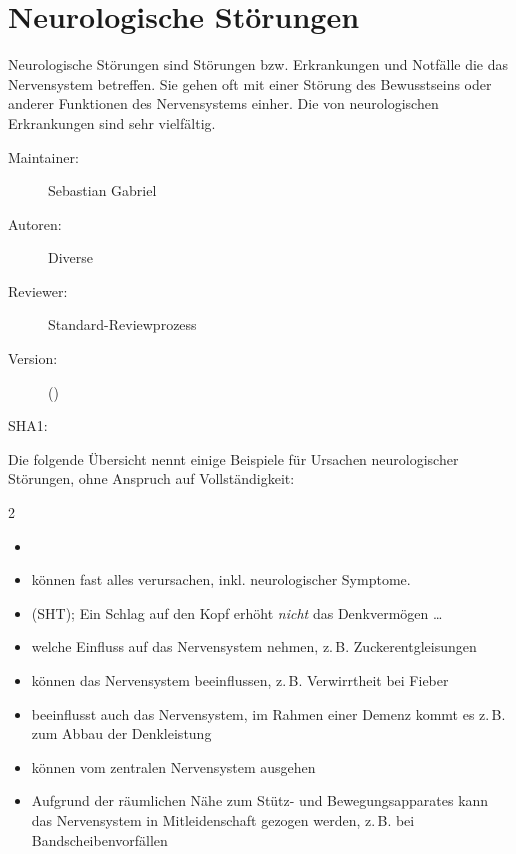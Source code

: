 \def\ChapterCode{NEU}
\chapter
[\CO{[NEU]} Neurologische Störungen]
{Neurologische Störungen}
\ChapterIntro
{%
Neurologische Störungen sind Störungen bzw.
Erkrankungen und Notfälle die das Nervensystem betreffen. Sie
gehen oft mit einer Störung des Bewusstseins oder anderer
Funktionen des Nervensystems einher. Die  von
neurologischen Erkrankungen sind sehr vielfältig. }
{%
\begin{description}
  \item[Maintainer:] Sebastian Gabriel
  \item[Autoren:] Diverse
  \item[Reviewer:] Standard-Reviewprozess
  \item[Version:] {\DocVersion} ({\DocVersionInfo})
  \item[SHA1:] {\DocGitCommit}
\end{description}

{\TxTeilkapitelAASS}
}

\bigskip

\noindent Die folgende Übersicht nennt einige
Beispiele für Ursachen neurologischer Störungen, ohne
Anspruch auf Vollständigkeit:

\begin{WidePar}
\begin{multicols}{2}
\begin{itemize}
  \item {}
  \item {} können fast alles verursachen, inkl.
  neurologischer
  Symptome.
  \item {} (SHT); Ein Schlag auf
  den Kopf erhöht \emph{nicht} das Denkvermögen \ldots
  \item {} welche Einfluss auf das
  Nervensystem nehmen, z.\,B. Zuckerentgleisungen
  \item {} können das Nervensystem beeinflussen,
  z.\,B. Verwirrtheit bei Fieber
  \item {} beeinflusst auch das Nervensystem, im Rahmen
  einer Demenz kommt es z.\,B. zum Abbau der Denkleistung
  \item {} können vom zentralen Nervensystem ausgehen
  \item {} Aufgrund der
  räumlichen Nähe zum Stütz- und Bewegungsapparates kann das
  Nervensystem in Mitleidenschaft gezogen werden, z.\,B. bei
  Bandscheibenvorfällen
\end{itemize}
\end{multicols}
\end{WidePar}

